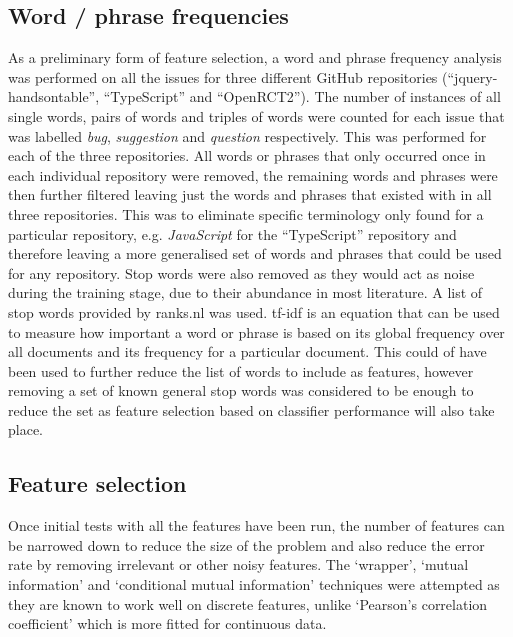 \subsection{Word / phrase frequencies}
\label{sec:background_wordfreq}
As a preliminary form of feature selection, a word and phrase frequency analysis was performed on all the issues for three
different GitHub repositories (``jquery-handsontable'', ``TypeScript'' and ``OpenRCT2''). The number of instances of all single
words, pairs of words and triples of words were counted for each issue that was labelled \textit{bug}, \textit{suggestion} and
\textit{question} respectively. This was performed for each of the three repositories. All words or phrases that only occurred
once in each individual repository were removed, the remaining words and phrases were then further filtered leaving just the
words and phrases that existed with in all three repositories. This was to eliminate specific terminology only found for a
particular repository, e.g. \textit{JavaScript} for the ``TypeScript'' repository and therefore leaving a more generalised set
of words and phrases that could be used for any repository. Stop words were also removed as they would act as noise during the training stage, due to their abundance in most literature. A list of stop words provided by ranks.nl \cite{ranks.nl} was used.
tf-idf is an equation that can be used to measure how important a word or phrase is based on its global frequency over all
documents and its frequency for a particular document. This could of have been used to further reduce the list of words to
include as features, however removing a set of known general stop words was considered to be enough to reduce the set as feature selection based on classifier performance will also take place.

\subsection{Feature selection}
Once initial tests with all the features have been run, the number of features can be narrowed down to reduce the size of the
problem and also reduce the error rate by removing irrelevant or other noisy features. The `wrapper', `mutual information' and
`conditional mutual information' techniques were attempted as they are known to work well on discrete features, unlike
`Pearson's correlation coefficient' which is more fitted for continuous data.

